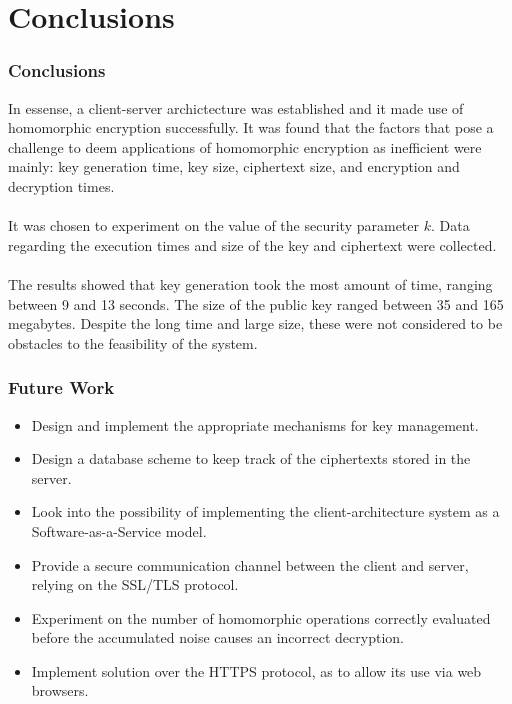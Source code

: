 \documentclass{beamer}
\begin{document}
\section{Conclusions}
\begin{frame}
\frametitle{Conclusions}

In essense, a client-server archictecture was established and it made use of homomorphic encryption successfully. It was found that the factors that pose a challenge to deem applications of homomorphic encryption as inefficient were mainly: key generation time, key size, ciphertext size, and encryption and decryption times. \\~\\

It was chosen to experiment on the value of the security parameter $k$. Data regarding the execution times and size of the key and ciphertext were collected. \\~\\

The results showed that key generation took the most amount of time, ranging between 9 and 13 seconds. The size of the public key ranged between 35 and 165 megabytes. Despite the long time and large size, these were not considered to be obstacles to the feasibility of the system. 

\end{frame}
\begin{frame}
\frametitle{Future Work}
\begin{itemize}
\item Design and implement the appropriate mechanisms for key management.
\item Design a database scheme to keep track of the ciphertexts stored in the server.
\item Look into the possibility of implementing the client-architecture system as a Software-as-a-Service model.
\item Provide a secure communication channel between the client and server, relying on the SSL/TLS protocol.
\item Experiment on the number of homomorphic operations correctly evaluated before the accumulated noise causes an incorrect decryption.
\item Implement solution over the HTTPS protocol, as to allow its use via web browsers.
\end{itemize}

\end{frame}



\end{document}
